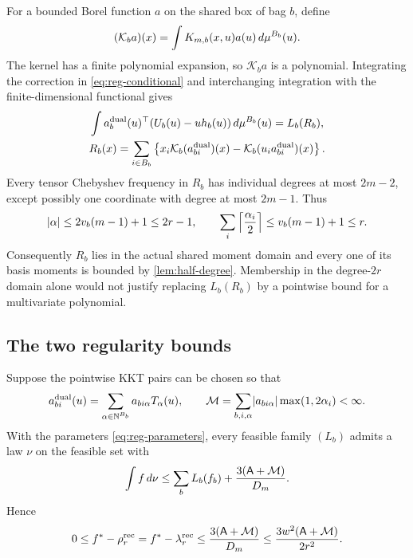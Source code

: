 For a bounded Borel function $a$ on the shared box of bag $b$, define
\[
 (\mathcal K_ba)(x)=\int K_{m,b}(x,u)a(u)\,d\mu^{B_b}(u).
\]
The kernel has a finite polynomial expansion, so $\mathcal K_ba$ is a
polynomial. Integrating the correction in \eqref{eq:reg-conditional}
and interchanging integration with the finite-dimensional functional
gives
\begin{equation}\label{eq:reg-commutator}
 \begin{split}
 &\int a_b^{\mathrm{dual}}(u)^\top(U_b(u)-u h_b(u))\,d\mu^{B_b}(u)
       =L_b(R_b),\\
 &R_b(x)=\sum_{i\in B_b}\left\{
 x_i\mathcal K_b(a_{bi}^{\mathrm{dual}})(x)
       -\mathcal K_b(u_i a_{bi}^{\mathrm{dual}})(x)\right\}.
 \end{split}
\end{equation}
Every tensor Chebyshev frequency in $R_b$ has individual degrees at
most $2m-2$, except possibly one coordinate with degree at most $2m-1$.
Thus
\begin{equation}\label{eq:reg-frequency-ledger}
 \lvert \alpha\rvert\le2v_b(m-1)+1\le2r-1,\qquad
 \sum_i\left\lceil\frac{\alpha_i}{2}\right\rceil
      \le v_b(m-1)+1\le r.
\end{equation}
Consequently $R_b$ lies in the actual shared moment domain and every
one of its basis moments is bounded by \cref{lem:half-degree}. Membership
in the degree-$2r$ domain alone would not justify replacing $L_b(R_b)$
by a pointwise bound for a multivariate polynomial.

\subsection{The two regularity bounds}\label{sec:reg-theorems}

\begin{theorem}\label{thm:reg-cheb}
Suppose the pointwise KKT pairs can be chosen so that
\begin{equation}\label{eq:reg-cheb-assumption}
 a_{bi}^{\mathrm{dual}}(u)=\sum_{\alpha\in\mathbb{N}^{B_b}}
               a_{bi\alpha}T_\alpha(u),\qquad
 \mathcal M=\sum_{b,i,\alpha}\lvert a_{bi\alpha}\rvert
                              \max(1,2\alpha_i)<\infty.
\end{equation}
With the parameters \eqref{eq:reg-parameters}, every feasible family
$(L_b)$ admits a law $\nu$ on the feasible set with
\begin{equation}\label{eq:reg-cheb-rounding}
 \int f\,d\nu\le\sum_bL_b(f_b)+\frac{3(\mathsf{A}+\mathcal M)}{D_m}.
\end{equation}
Hence
\[
 0\le f^{*}-\rho^{\mathrm{rec}}_r=f^{*}-\lambda^{\mathrm{rec}}_r
 \le\frac{3(\mathsf{A}+\mathcal M)}{D_m}
 \le\frac{3w^2(\mathsf{A}+\mathcal M)}{2r^2}.
\]
\end{theorem}

